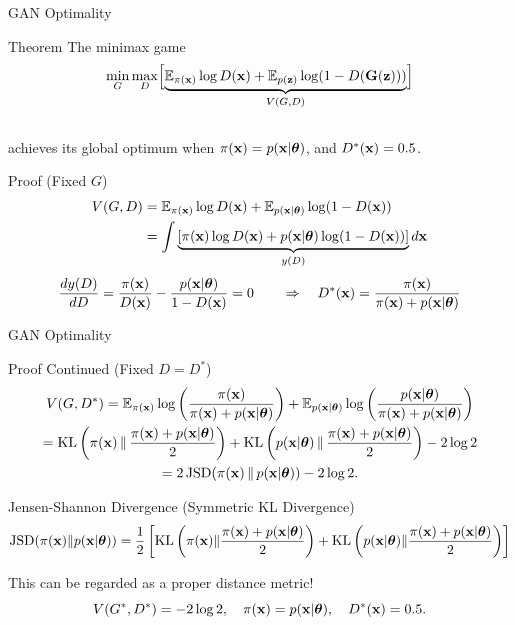 \documentclass{beamer}
\begin{document}
\begin{frame}{GAN Optimality}
	\begin{block}{Theorem}
		The minimax game
		\vspace{-0.3cm}
		\[
			\min_{G} \max_D \Bigl[ \underbrace{\mathbb{E}_{\pi(\mathbf{x})} \log D(\mathbf{x}) + \mathbb{E}_{p(\mathbf{z})} \log (1 - D(\mathbf{G}(\mathbf{z})))}_{V(G, D)} \Bigr]
		\]
		\vspace{-0.5cm} \\
		achieves its global optimum when $\pi(\mathbf{x}) = p(\mathbf{x} | \boldsymbol{\theta})$, and $D^*(\mathbf{x}) = 0.5$.
	\end{block}
	\begin{block}{Proof (Fixed $G$)}
		\vspace{-0.5cm}
		\begin{align*}
			V(G, D) &= \mathbb{E}_{\pi(\mathbf{x})} \log D(\mathbf{x}) + \mathbb{E}_{p(\mathbf{x} | \boldsymbol{\theta})} \log (1 - D(\mathbf{x})) \\
			&= \int \underbrace{\left[ \pi(\mathbf{x}) \log D(\mathbf{x}) + p(\mathbf{x} | \boldsymbol{\theta})\log (1 - D(\mathbf{x})) \right]}_{y(D)} d \mathbf{x}
		\end{align*}
		\vspace{-0.2cm}
		\[
			\frac{d y(D)}{d D} = \frac{\pi(\mathbf{x})}{D(\mathbf{x})} - \frac{p(\mathbf{x} | \boldsymbol{\theta})}{1 - D(\mathbf{x})} = 0 \qquad \Rightarrow \quad D^*(\mathbf{x}) = \frac{\pi(\mathbf{x})}{\pi(\mathbf{x}) + p(\mathbf{x} | \boldsymbol{\theta})}
		\]
	\end{block}
\end{frame}
\begin{frame}{GAN Optimality}
	\begin{block}{Proof Continued (Fixed $D = D^*$)}
		\vspace{-0.5cm}
		\begin{multline*}
			V(G, D^*) = \mathbb{E}_{\pi(\mathbf{x})} \log \left( \frac{\pi(\mathbf{x})}{\pi(\mathbf{x}) + p(\mathbf{x} | \boldsymbol{\theta})} \right) + \mathbb{E}_{p(\mathbf{x} | \boldsymbol{\theta})} \log \left( \frac{p(\mathbf{x} | \boldsymbol{\theta})}{\pi(\mathbf{x}) + p(\mathbf{x} | \boldsymbol{\theta})}\right)  \\
		 = \mathrm{KL} \left(\pi(\mathbf{x}) \,\|\, \frac{\pi(\mathbf{x}) + p(\mathbf{x} | \boldsymbol{\theta})}{2}\right) + \mathrm{KL} \left(p(\mathbf{x} | \boldsymbol{\theta}) \,\|\, \frac{\pi(\mathbf{x}) + p(\mathbf{x} | \boldsymbol{\theta})}{2}\right) - 2\log 2 \\
		 = 2\,\mathrm{JSD}(\pi(\mathbf{x}) \,\|\, p(\mathbf{x} | \boldsymbol{\theta})) - 2\log 2.
		\end{multline*}
	\end{block}
	\vspace{-0.3cm}
	\begin{block}{Jensen-Shannon Divergence (Symmetric KL Divergence)}
		\vspace{-0.2cm}
		\footnotesize
		\[
			\mathrm{JSD}(\pi(\mathbf{x}) \| p(\mathbf{x} | \boldsymbol{\theta})) = \frac{1}{2} \left[\mathrm{KL} \left(\pi(\mathbf{x}) \| \frac{\pi(\mathbf{x}) + p(\mathbf{x} | \boldsymbol{\theta})}{2}\right) + \mathrm{KL} \left(p(\mathbf{x} | \boldsymbol{\theta}) \| \frac{\pi(\mathbf{x}) + p(\mathbf{x} | \boldsymbol{\theta})}{2}\right) \right]
		\]
	\end{block}
	This can be regarded as a proper distance metric!
	\[
		V(G^*, D^*) = -2\log 2, \quad \pi(\mathbf{x}) = p(\mathbf{x} | \boldsymbol{\theta}), \quad  D^*(\mathbf{x}) = 0.5.
	\]
	
\end{frame}
\end{document}
